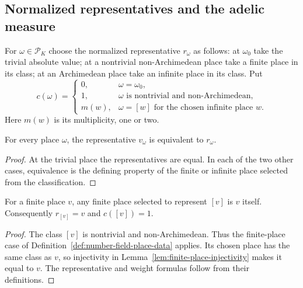 \subsection{Normalized representatives and the adelic measure}

\begin{definition}\label{def:number-field-place-data}
\leanok
{}
For $\omega\in\mathcal P_K$ choose the normalized representative
$r_\omega$ as follows: at $\omega_0$ take the trivial absolute value;
at a nontrivial non-Archimedean place take a finite place in its class;
at an Archimedean place take an infinite place in its class. Put
\[
 c(\omega)=
 \begin{cases}
 0,&\omega=\omega_0,\\
 1,&\omega\text{ is nontrivial and non-Archimedean},\\
 m(w),&\omega=[w]\text{ for the chosen infinite place }w.
 \end{cases}
\]
Here $m(w)$ is its multiplicity, one or two.
\end{definition}

\begin{lemma}\label{lem:number-field-representative-equivalence}
\leanok
{}
For every place $\omega$, the representative $v_\omega$ is equivalent
to $r_\omega$.
\end{lemma}
\begin{proof}
At the trivial place the representatives are equal. In each of the two
other cases, equivalence is the defining property of the finite or infinite
place selected from the classification.
\end{proof}

\begin{lemma}\label{lem:number-field-finite-normalization}
\leanok
{}
For a finite place $v$, any finite place selected to represent $[v]$ is
$v$ itself. Consequently $r_{[v]}=v$ and $c([v])=1$.
\end{lemma}
\begin{proof}
The class $[v]$ is nontrivial and non-Archimedean. Thus the finite-place
case of Definition~\ref{def:number-field-place-data} applies. Its chosen
place has the same class as $v$, so injectivity in
Lemma~\ref{lem:finite-place-injectivity} makes it equal to $v$.
The representative and weight formulas follow from their definitions.
\end{proof}

